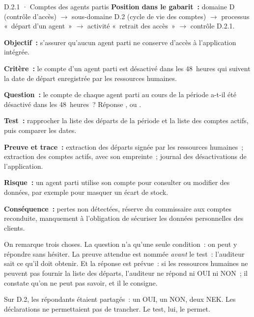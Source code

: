 \begin{boxobjet}{D.2.1 · Comptes des agents partis}
\textbf{Position dans le gabarit~:} domaine D (contrôle d'accès)
$\rightarrow$ sous-domaine D.2 (cycle de vie des comptes) $\rightarrow$
processus «~départ d'un agent~» $\rightarrow$ activité «~retrait des
accès~» $\rightarrow$ contrôle D.2.1.

\textbf{Objectif~:} s'assurer qu'aucun agent parti ne conserve d'accès à
l'application intégrée.

\textbf{Critère~:} le compte d'un agent parti est désactivé dans les
48~heures qui suivent la date de départ enregistrée par les ressources
humaines.

\textbf{Question~:} le compte de chaque agent parti au cours de la période
a-t-il été désactivé dans les 48~heures~? Réponse \OUI{}, \NON{} ou \NEK{}.

\textbf{Test~:} rapprocher la liste des départs de la période et la liste
des comptes actifs, puis comparer les dates.

\textbf{Preuve et trace~:} extraction des départs signée par les ressources
humaines~; extraction des comptes actifs, avec son empreinte~; journal des
désactivations de l'application.

\textbf{Risque~:} un agent parti utilise son compte pour consulter ou
modifier des données, par exemple pour masquer un écart de stock.

\textbf{Conséquence~:} pertes non détectées, réserve du commissaire aux
comptes reconduite, manquement à l'obligation de sécuriser les données
personnelles des clients.
\end{boxobjet}

On remarque trois choses. La question n'a qu'une seule condition~: on peut
y répondre sans hésiter. La preuve attendue est nommée \emph{avant} le
test~: l'auditeur sait ce qu'il doit obtenir. Et la réponse \NEK{} est
prévue~: si les ressources humaines ne peuvent pas fournir la liste des
départs, l'auditeur ne répond ni OUI ni NON~; il constate qu'on ne peut pas
savoir, et il le consigne.

Sur D.2, les répondants étaient partagés~: un OUI, un NON, deux NEK. Les
déclarations ne permettaient pas de trancher. Le test, lui, le permet.

